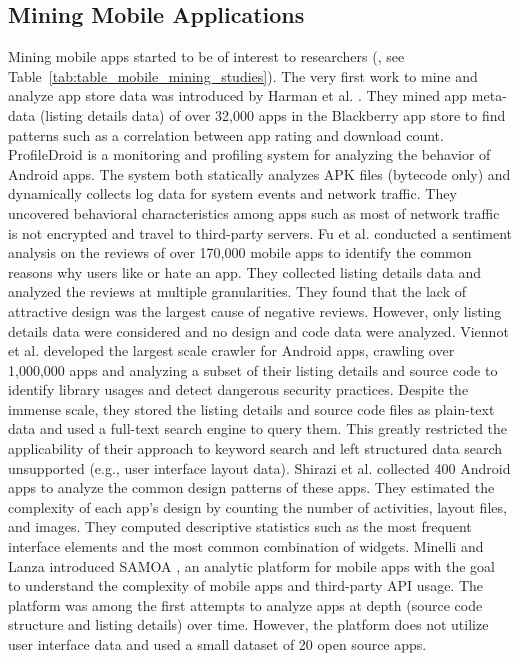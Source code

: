 \subsection{Mining Mobile Applications}
Mining mobile apps started to be of interest to researchers (\cite{Enck_2010_OSDI,Enck_2011_USENIX,Ma_WWW_2012,crussell_2012_ESORICS,Frank_2012_ICDM,zhou_2012_SP_dissecting,Yin_2013_WSDM,Minelli_2013_CMSREuro,Pandita_2013_USENIX,gorla_2014_ICSE,chen_2014_ICSE,Liu_2014_ICSE,Lin_2014_SOUPS,rasthofer_2014_NDSS,Liu_2015_MobiSys,seneviratne_2015_SIGMobile,Yang_2015_ICSE,Baeza-Yates_2015_WSDM,Chen_2015_WSDM,Liu_2015_WSDM,Tufano_ICSE_2015,Park_SIGIR_2015}, see Table~\ref{tab:table_mobile_mining_studies}).
The very first work to mine and analyze app store data was introduced by Harman et al. \cite{Harman_2012_MSR}.
They mined app meta-data (listing details data) of over 32,000 apps in the Blackberry app store to find patterns such as a correlation between app rating and download count.
ProfileDroid \cite{Wei_2012_MobiCom} is a monitoring and profiling system for analyzing the behavior of Android apps.
The system both statically analyzes APK files (bytecode only) and dynamically collects log data for system events and network traffic.
They uncovered behavioral characteristics among apps such as most of network traffic is not encrypted and travel to third-party servers.
Fu et al. \cite{fu_2013_KDD} conducted a sentiment analysis on the reviews of over 170,000 mobile apps to identify the common reasons why users like or hate an app. 
They collected listing details data and analyzed the reviews at multiple granularities.
They found that the lack of attractive design was the largest cause of negative reviews. 
However, only listing details data were considered and no design and code data were analyzed.
Viennot et al. \cite{viennot_2014_metrics} developed the largest scale crawler for Android apps, crawling over 1,000,000 apps and analyzing a subset of their listing details and source code to identify library usages and detect dangerous security practices.
Despite the immense scale, they stored the listing details and source code files as plain-text data and used a full-text search engine to query them.
This greatly restricted the applicability of their approach to keyword search and left structured data search unsupported (e.g., user interface layout data).
Shirazi et al. \cite{shirazi_EICS_2013} collected 400 Android apps to analyze the common design patterns of these apps.
They estimated the complexity of each app's design by counting the number of activities, layout files, and images.
They computed descriptive statistics such as the most frequent interface elements and the most common combination of widgets.
Minelli and Lanza introduced SAMOA \cite{Minelli_2013_CMSREuro}, an analytic platform for mobile apps with the goal to understand the complexity of mobile apps and third-party API usage.
The platform was among the first attempts to analyze apps at depth (source code structure and listing details) over time.
However, the platform does not utilize user interface data and used a small dataset of 20 open source apps.

